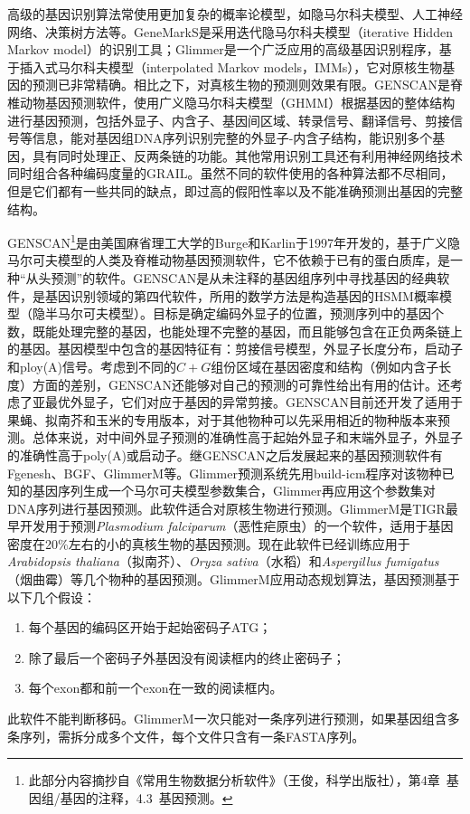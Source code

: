 \documentclass[11pt,a4paper,twoside]{book}
\begin{document}
高级的基因识别算法常使用更加复杂的概率论模型，如隐马尔科夫模型、人工神经网络、决策树方法等。GeneMarkS是采用迭代隐马尔科夫模型（iterative Hidden Markov model）的识别工具；Glimmer是一个广泛应用的高级基因识别程序，基于插入式马尔科夫模型（interpolated Markov models，IMMs），它对原核生物基因的预测已非常精确。相比之下，对真核生物的预测则效果有限。GENSCAN是脊椎动物基因预测软件，使用广义隐马尔科夫模型（GHMM）根据基因的整体结构进行基因预测，包括外显子、内含子、基因间区域、转录信号、翻译信号、剪接信号等信息，能对基因组DNA序列识别完整的外显子-内含子结构，能识别多个基因，具有同时处理正、反两条链的功能。其他常用识别工具还有利用神经网络技术同时组合各种编码度量的GRAIL。虽然不同的软件使用的各种算法都不尽相同，但是它们都有一些共同的缺点，即过高的假阳性率以及不能准确预测出基因的完整结构。

GENSCAN\footnote{此部分内容摘抄自《常用生物数据分析软件》（王俊，科学出版社），第4章\ 基因组/基因的注释，4.3\ 基因预测。}是由美国麻省理工大学的Burge和Karlin于1997年开发的，基于广义隐马尔可夫模型的人类及脊椎动物基因预测软件，它不依赖于已有的蛋白质库，是一种“从头预测”的软件。GENSCAN是从未注释的基因组序列中寻找基因的经典软件，是基因识别领域的第四代软件，所用的数学方法是构造基因的HSMM概率模型（隐半马尔可夫模型）。目标是确定编码外显子的位置，预测序列中的基因个数，既能处理完整的基因，也能处理不完整的基因，而且能够包含在正负两条链上的基因。基因模型中包含的基因特征有：剪接信号模型，外显子长度分布，启动子和ploy(A)信号。考虑到不同的$C+G$组份区域在基因密度和结构（例如内含子长度）方面的差别，GENSCAN还能够对自己的预测的可靠性给出有用的估计。还考虑了亚最优外显子，它们对应于基因的异常剪接。GENSCAN目前还开发了适用于果蝇、拟南芥和玉米的专用版本，对于其他物种可以先采用相近的物种版本来预测。总体来说，对中间外显子预测的准确性高于起始外显子和末端外显子，外显子的准确性高于poly(A)或启动子。继GENSCAN之后发展起来的基因预测软件有Fgenesh、BGF、GlimmerM等。Glimmer预测系统先用build-icm程序对该物种已知的基因序列生成一个马尔可夫模型参数集合，Glimmer再应用这个参数集对DNA序列进行基因预测。此软件适合对原核生物进行预测。GlimmerM是TIGR最早开发用于预测\textit{Plasmodium falciparum}（恶性疟原虫）的一个软件，适用于基因密度在20\%左右的小的真核生物的基因预测。现在此软件已经训练应用于\textit{Arabidopsis thaliana}（拟南芥）、\textit{Oryza sativa}（水稻）和\textit{Aspergillus fumigatus}（烟曲霉）等几个物种的基因预测。GlimmerM应用动态规划算法，基因预测基于以下几个假设：
\begin{enumerate}
  \item 每个基因的编码区开始于起始密码子ATG；
  \item 除了最后一个密码子外基因没有阅读框内的终止密码子；
  \item 每个exon都和前一个exon在一致的阅读框内。
\end{enumerate}
此软件不能判断移码。GlimmerM一次只能对一条序列进行预测，如果基因组含多条序列，需拆分成多个文件，每个文件只含有一条FASTA序列。
\end{document}
